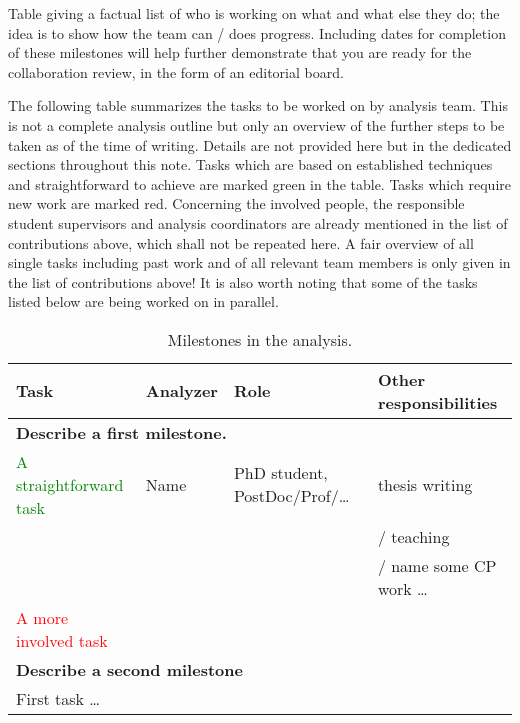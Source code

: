  Table giving a factual list of who is working on what and what else they do; the idea is to show how the team can / does progress. 
 Including dates for completion of these milestones will help further demonstrate that you are ready for the collaboration
 review, in the form of an editorial board.

The following table summarizes the tasks to be worked on by analysis team.
This is not a complete analysis outline but only an overview of the further steps to be taken as of the time of writing.
Details are not provided here but in the dedicated sections throughout this note.
Tasks which are based on established techniques and straightforward to achieve are marked green in the table.
Tasks which require new work are marked red.
Concerning the involved people, the responsible student supervisors and analysis coordinators are already mentioned in the list of contributions above,
which shall not be repeated here.
A fair overview of all single tasks including past work and of all relevant team members is only given in the list of contributions above!
It is also worth noting that some of the tasks listed below are being worked on in parallel. 

\begin{table}[ht]
  \caption{Milestones in the analysis.}%
  \label{tab:Miles_Ahead} 
\begin{tabular}{llll} 
  \toprule
  \textbf{Task} & \textbf{Analyzer} & \textbf{Role} & \textbf{Other responsibilities} \\
  \midrule
  \multicolumn{4}{p{\textwidth}}{\textbf{Describe a first milestone.}} \\
  \midrule
  \textcolor{green}{A straightforward task}       & Name         & PhD student, PostDoc/Prof/\ldots & thesis writing \\
  &&& / teaching \\
  &&& / name some CP work \ldots \\ 
  \textcolor{red}{A more involved task}      &    &    &  \\ 
  \bottomrule
  
  \multicolumn{4}{l}{\textbf{Describe a second milestone}} \\
  \midrule
  First task \ldots      &          &  &  \\ 
  \bottomrule
\end{tabular}
\end{table}


